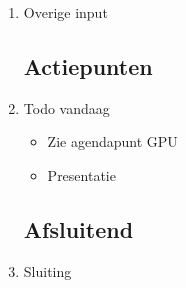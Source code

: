 \documentclass{article}
\begin{document}
\begin{enumerate}
	\item Overige input
	\subsection*{Actiepunten}
	\item Todo vandaag
	\begin{itemize}
		\item Zie agendapunt GPU
		\item Presentatie
	\end{itemize}

	\noindent 
	\subsection*{Afsluitend}
	\item Sluiting

\end{enumerate}
\end{document}
